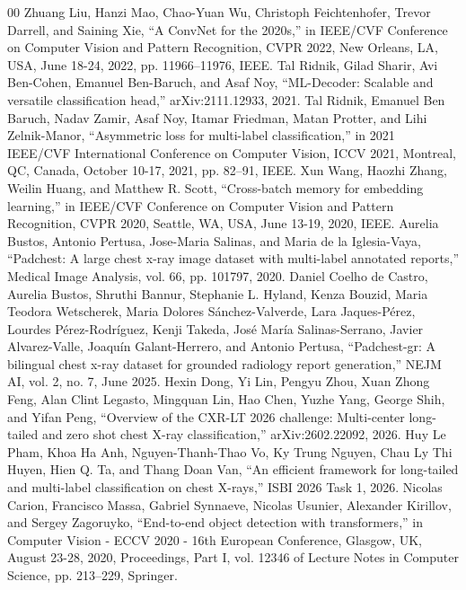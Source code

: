 \documentclass[conference]{IEEEtran}
\begin{document}
\begin{thebibliography}{00}
 Zhuang Liu, Hanzi Mao, Chao-Yuan Wu, Christoph Feichtenhofer, Trevor Darrell, and Saining Xie, ``A ConvNet for the 2020s,'' in IEEE/CVF Conference on Computer Vision and Pattern Recognition, CVPR 2022, New Orleans, LA, USA, June 18-24, 2022, pp. 11966--11976, IEEE.
 Tal Ridnik, Gilad Sharir, Avi Ben-Cohen, Emanuel Ben-Baruch, and Asaf Noy, ``ML-Decoder: Scalable and versatile classification head,'' arXiv:2111.12933, 2021.
 Tal Ridnik, Emanuel Ben Baruch, Nadav Zamir, Asaf Noy, Itamar Friedman, Matan Protter, and Lihi Zelnik-Manor, ``Asymmetric loss for multi-label classification,'' in 2021 IEEE/CVF International Conference on Computer Vision, ICCV 2021, Montreal, QC, Canada, October 10-17, 2021, pp. 82--91, IEEE.
 Xun Wang, Haozhi Zhang, Weilin Huang, and Matthew R. Scott, ``Cross-batch memory for embedding learning,'' in IEEE/CVF Conference on Computer Vision and Pattern Recognition, CVPR 2020, Seattle, WA, USA, June 13-19, 2020, IEEE.
 Aurelia Bustos, Antonio Pertusa, Jose-Maria Salinas, and Maria de la Iglesia-Vaya, ``Padchest: A large chest x-ray image dataset with multi-label annotated reports,'' Medical Image Analysis, vol. 66, pp. 101797, 2020.
 Daniel Coelho de Castro, Aurelia Bustos, Shruthi Bannur, Stephanie L. Hyland, Kenza Bouzid, Maria Teodora Wetscherek, Maria Dolores S\'anchez-Valverde, Lara Jaques-P\'erez, Lourdes P\'erez-Rodr\'iguez, Kenji Takeda, Jos\'e Mar\'ia Salinas-Serrano, Javier Alvarez-Valle, Joaqu\'in Galant-Herrero, and Antonio Pertusa, ``Padchest-gr: A bilingual chest x-ray dataset for grounded radiology report generation,'' NEJM AI, vol. 2, no. 7, June 2025.
 Hexin Dong, Yi Lin, Pengyu Zhou, Xuan Zhong Feng, Alan Clint Legasto, Mingquan Lin, Hao Chen, Yuzhe Yang, George Shih, and Yifan Peng, ``Overview of the CXR-LT 2026 challenge: Multi-center long-tailed and zero shot chest X-ray classification,'' arXiv:2602.22092, 2026.
 Huy Le Pham, Khoa Ha Anh, Nguyen-Thanh-Thao Vo, Ky Trung Nguyen, Chau Ly Thi Huyen, Hien Q. Ta, and Thang Doan Van, ``An efficient framework for long-tailed and multi-label classification on chest X-rays,'' ISBI 2026 Task 1, 2026.
 Nicolas Carion, Francisco Massa, Gabriel Synnaeve, Nicolas Usunier, Alexander Kirillov, and Sergey Zagoruyko, ``End-to-end object detection with transformers,'' in Computer Vision - ECCV 2020 - 16th European Conference, Glasgow, UK, August 23-28, 2020, Proceedings, Part I, vol. 12346 of Lecture Notes in Computer Science, pp. 213--229, Springer.

\end{thebibliography}
\end{document}
